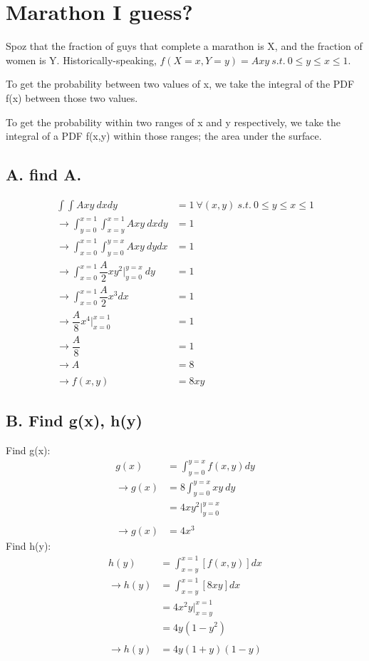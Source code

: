 \documentclass[]{article}
\begin{document}
	\pagebreak
	\section{Marathon I guess?}
		Spoz that the fraction of guys that complete a marathon is X, and the fraction of women is Y. Historically-speaking, $f(X=x, Y=y) = Axy\ s.t.\ 0\leq y\leq x\leq 1$.
		
		To get the probability between two values of x, we take the integral of the PDF f(x)  between those two values.
		
		To get the probability within two ranges of x and y respectively, we take the integral of a PDF f(x,y) within those ranges; the area under the surface.
		
		\subsection{A. find A.}
		
			\begin{align*}
				\int\int Axy\ dxdy &= 1\ \forall (x,y)\ s.t.\ 0\leq y\leq x\leq 1\\
				\to \int_{y=0}^{x=1} \int_{x=y}^{x=1} Axy\ dxdy &= 1 \\
				\to \int_{x=0}^{x=1} \int_{y=0}^{y=x} Axy\ dydx &= 1 \\
				\to \int_{x=0}^{x=1} \dfrac{A}{2}xy^2 |_{y=0}^{y=x}\ dy &= 1 \\
				\to \int_{x=0}^{x=1} \dfrac{A}{2}x^3 dx &= 1 \\
				\to \dfrac{A}{8}x^4 |_{x=0}^{x=1} &= 1 \\
				\to \dfrac{A}{8} &= 1 \\
				\to A &= 8 \\\\
				\to f(x,y) &= 8xy
			\end{align*}
		
		\pagebreak
		\subsection{B. Find g(x), h(y)}
			Find g(x):
			\begin{align*}
				g(x) &= \int_{y=0}^{y=x}f(x,y)dy \\
				\to g(x) &= 8\int_{y=0}^{y=x}xy\ dy \\
				         &= 4xy^2|_{y=0}^{y=x} \\\\
				\to g(x) &= 4x^3
			\end{align*}
			Find h(y):
			\begin{align*}
				    h(y) &= \int_{x=y}^{x=1}[f(x,y)]dx \\
				\to h(y) &= \int_{x=y}^{x=1}[8xy]dx \\
				         &= 4x^2y|_{x=y}^{x=1} \\
				         &= 4y(1 - y^2) \\\\
				\to h(y) &= 4y(1+y)(1-y)
			\end{align*}
			
\end{document}

